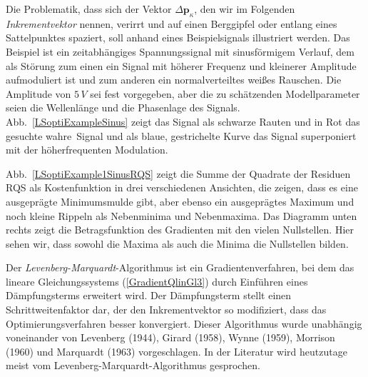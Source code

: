 Die Problematik, dass sich der Vektor $\Delta \mathbf{p}_{\kappa}$, den wir im
Folgenden \textsl{Inkrementvektor} nennen, verirrt und auf
einen Berggipfel oder entlang eines Sattelpunktes spaziert, soll anhand eines Beispielsignals
illustriert werden. Das Beispiel ist ein zeitabhängiges Spannungssignal mit sinusförmigem Verlauf,
dem als Störung zum einen ein Signal mit höherer Frequenz und kleinerer Amplitude aufmoduliert ist
und zum anderen ein normalverteiltes weißes Rauschen.
Die Amplitude von $5 \, V$ sei fest vorgegeben, aber die zu schätzenden Modellparameter seien
die Wellenlänge und die Phasenlage des Signals. Abb.~\ref{LSoptiExampleSinus} zeigt das Signal als
schwarze Rauten und in Rot das gesuchte \glqq wahre\grqq ~Signal und als blaue, gestrichelte Kurve
das Signal superponiert mit der höherfrequenten Modulation.

Abb.~\ref{LSoptiExample1SinusRQS} zeigt die Summe der Quadrate der Residuen RQS als
Kostenfunktion in drei verschiedenen Ansichten, die zeigen, dass es eine ausgeprägte Minimumsmulde gibt,
aber ebenso ein ausgeprägtes Maximum und noch kleine Rippeln als Nebenminima und Nebenmaxima.
Das Diagramm unten rechts zeigt die Betragsfunktion des Gradienten mit den vielen Nullstellen.
Hier sehen wir, dass sowohl die Maxima als auch die Minima die Nullstellen bilden.

Der \textsl{Levenberg-Marquardt}-Algorithmus ist ein Gradientenverfahren, bei dem das lineare
Gleichungssystems (\ref{GradientQlinGl3}) 
durch Einführen eines Dämpfungsterms erweitert wird. Der Dämpfungsterm stellt einen
Schrittweitenfaktor dar, der den Inkrementvektor
so modifiziert, dass das Optimierungsverfahren besser konvergiert. Dieser
Algorithmus wurde unabhängig voneinander von Levenberg (1944), Girard (1958), Wynne (1959), 
Morrison (1960) und Marquardt (1963) vorgeschlagen. In der Literatur wird heutzutage meist vom 
Levenberg-Marquardt-Algorithmus gesprochen.

